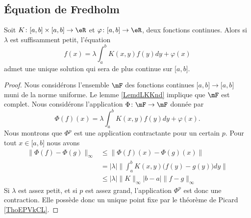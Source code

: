 \subsection{Équation de Fredholm}

\begin{theorem}     \label{ThoagJPZJ}
    Soit \( K\colon \mathopen[ a , b \mathclose]\times \mathopen[ a , b \mathclose]\to \eR\) et \( \varphi\colon \mathopen[ a , b \mathclose]\to \eR\), deux fonctions continues. Alors si \( \lambda\) est suffisamment petit, l'équation
    \begin{equation}
        f(x)=\lambda\int_a^bK(x,y)f(y)dy+\varphi(x)
    \end{equation}
    admet une unique solution qui sera de plus continue sur \( \mathopen[ a , b \mathclose]\).
\end{theorem}

\begin{proof}
    Nous considérons l'ensemble \( \mF\) des fonctions continues \( \mathopen[ a , b \mathclose]\to\mathopen[ a , b \mathclose]\) muni de la norme uniforme. Le lemme \ref{LemdLKKnd} implique que \( \mF\) est complet. Nous considérons l'application \( \Phi\colon \mF\to \mF\) donnée par
    \begin{equation}
        \Phi(f)(x)=\lambda\int_a^bK(x,y)f(y)dy+\varphi(x). 
    \end{equation}
    Nous montrons que \( \Phi^p\) est une application contractante pour un certain \( p\). Pour tout \( x\in \mathopen[ a , b \mathclose]\) nous avons
    \begin{subequations}
        \begin{align}
            \| \Phi(f)-\Phi(g) \|_{\infty}&\leq \| \Phi(f)(x)-\Phi(g)(x) \|\\
            &=| \lambda |\Big\| \int_a^bK(x,y)\big( f(y)-g(y) \big)dy  \Big\|\\
            &\leq | \lambda |\| K \|_{\infty}| b-a |\| f-g \|_{\infty}
        \end{align}
    \end{subequations}
    Si \( \lambda\) est assez petit, et si \( p\) est assez grand, l'application \( \Phi^p\) est donc une contraction. Elle possède donc un unique point fixe par le théorème de Picard \ref{ThoEPVkCL}.
\end{proof}

